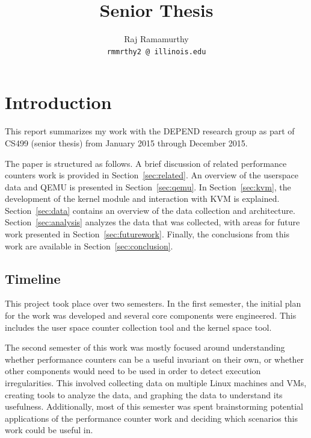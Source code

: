 \documentclass[notitlepage]{article}
\begin{document}
\title{Senior Thesis}
\author{Raj Ramamurthy\\
  \texttt{rmmrthy2 @ illinois.edu}}
\maketitle


\section{Introduction}
\label{sec:intro} This report summarizes my work with the DEPEND research group
as part of CS499 (senior thesis) from January 2015 through December 2015.

The paper is structured as follows. A brief discussion of related performance
counters work is provided in Section~\ref{sec:related}. An overview of the
userspace data and QEMU is presented in Section~\ref{sec:qemu}. In
Section~\ref{sec:kvm}, the development of the kernel module and interaction with
KVM is explained. Section~\ref{sec:data} contains an overview of the data
collection and architecture. Section~\ref{sec:analysis} analyzes the data that
was collected, with areas for future work presented in
Section~\ref{sec:futurework}. Finally, the conclusions from this work are
available in Section~\ref{sec:conclusion}.

\subsection{Timeline}
This project took place over two semesters. In the first semester, the initial
plan for the work was developed and several core components were engineered.
This includes the user space counter collection tool and the kernel space tool.

The second semester of this work was mostly focused around understanding whether
performance counters can be a useful invariant on their own, or whether other
components would need to be used in order to detect execution irregularities.
This involved collecting data on multiple Linux machines and VMs, creating tools
to analyze the data, and graphing the data to understand its usefulness.
Additionally, most of this semester was spent brainstorming potential
applications of the performance counter work and deciding which scenarios this
work could be useful in.
\end{document}
